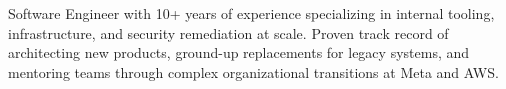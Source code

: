 


\begin{cvparagraph}
Software Engineer with 10+ years of experience specializing in internal tooling, infrastructure, and security remediation at scale. Proven track record of architecting new products, ground-up replacements for legacy systems, and mentoring teams through complex organizational transitions at Meta and AWS.
\end{cvparagraph}
